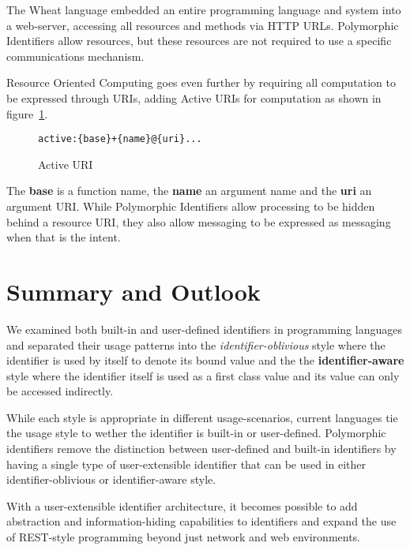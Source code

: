 \documentclass[preprint,authoryear]{acm_proc_article-sp}
\begin{document}
The Wheat language \cite{wheat} embedded an entire programming language
and system into a web-server, accessing all resources and methods via
HTTP URLs.  Polymorphic Identifiers allow resources, but these resources
are not required to use a specific communications mechanism.


Resource Oriented Computing \cite{roc} goes even further by
requiring all computation to be expressed through URIs, adding Active URIs
for computation as shown in figure~\ref{activeuri}.   


\begin{figure}[htbp]
\begin{center}
\begin{small}
\begin{verbatim}
active:{base}+{name}@{uri}...
\end{verbatim}
\end{small}
\caption{Active URI}
\label{activeuri}
\end{center}
\end{figure}

The {\bf base} is a function name, the {\bf name} an argument name and the
{\bf uri} an argument URI.
 While Polymorphic Identifiers allow processing to be
hidden behind a resource URI, they also allow messaging to be expressed
as messaging when that is the intent.



\section{Summary and Outlook}

We examined both built-in and user-defined identifiers in programming languages 
and separated their usage patterns into the {\em identifier-oblivious} style where
the identifier is used by itself to denote its bound value and the 
the {\bf identifier-aware} style where the identifier itself is used as a first class value
and its value can only be accessed indirectly.

While each style is appropriate in different usage-scenarios, current languages 
tie the usage style to wether the identifier is built-in or user-defined.  Polymorphic
identifiers remove the distinction between user-defined and built-in identifiers by having
a single type of user-extensible identifier that can be used in either identifier-oblivious
or identifier-aware style.

With a user-extensible identifier architecture, it becomes possible to add abstraction
and information-hiding capabilities to identifiers and expand the use of REST-style
programming beyond just network and web environments.
\end{document}
